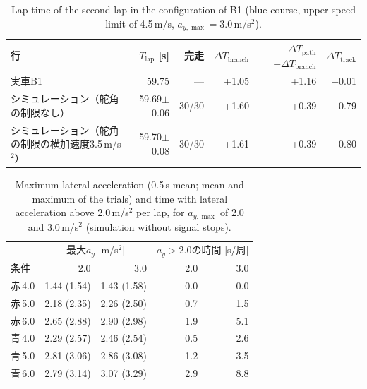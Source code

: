 \begin{table}[!htbp]
  \centering
  \caption{Lap time of the second lap in the configuration of B1 (blue course, upper speed limit of 4.5\,m/s, $a_{y,\max}=3.0$\,m/s$^2$).}
  \label{tab:sim_b1}
  \footnotesize
  \begin{lrbox}{\tblbox}\setlength{\tabcolsep}{4pt}\begin{tabular}{L{6.2cm}rrrrr}
    \toprule
    行 & $T_{\mathrm{lap}}$ [s] & 完走 & $\Delta T_{\mathrm{branch}}$ &  & $\Delta T_{\mathrm{track}}$ \\
    \midrule
    実車B1 & 59.75 & --- & +1.05 & +1.16 & +0.01 \\
    シミュレーション（舵角の制限なし） & 59.69$\pm$ 0.06 & 30/30 & +1.60 & +0.39 & +0.79 \\
    シミュレーション（舵角の制限の横加速度3.5\,m/s$^2$） & 59.70$\pm$ 0.08 & 30/30 & +1.61 & +0.39 & +0.80 \\
    \bottomrule
  \end{tabular}\end{lrbox}\usebox{\tblbox}
\end{table}

\begin{table}[!htbp]
  \centering
  \caption[Lateral acceleration in the simulation with $a_{y,\max}$ of 2.0 and 3.0 m/s$^2$.]{Maximum lateral acceleration (0.5\,s mean; mean and maximum of the trials) and time with lateral acceleration above 2.0\,m/s$^2$ per lap, for $a_{y,\max}$ of 2.0 and 3.0\,m/s$^2$ (simulation without signal stops).}
  \label{tab:sim_ay_side}
  \footnotesize
  \begin{lrbox}{\tblbox}\setlength{\tabcolsep}{4pt}\begin{tabular}{lrrrr}
    \toprule
    & \multicolumn{2}{c}{最大$a_y$ [m/s$^2$]} & \multicolumn{2}{c}{$a_y>2.0$の時間 [s/周]} \\
    \cmidrule(lr){2-3}\cmidrule(lr){4-5}
    条件 & 2.0 & 3.0 & 2.0 & 3.0 \\
    \midrule
    赤\,4.0 & 1.44 (1.54) & 1.43 (1.58) & 0.0 & 0.0 \\
    赤\,5.0 & 2.18 (2.35) & 2.26 (2.50) & 0.7 & 1.5 \\
    赤\,6.0 & 2.65 (2.88) & 2.90 (2.98) & 1.9 & 5.1 \\
    \addlinespace[3pt]
    青\,4.0 & 2.29 (2.57) & 2.46 (2.54) & 0.5 & 2.6 \\
    青\,5.0 & 2.81 (3.06) & 2.86 (3.08) & 1.2 & 3.5 \\
    青\,6.0 & 2.79 (3.14) & 3.07 (3.29) & 2.9 & 8.8 \\
    \bottomrule
  \end{tabular}\end{lrbox}\usebox{\tblbox}
\end{table}

